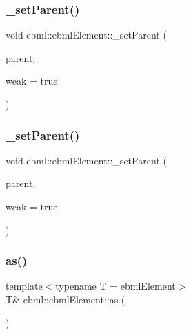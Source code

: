 \subsubsection{\texorpdfstring{\+\_\+set\+Parent()}{\_setParent()}\hspace{0.1cm}{\footnotesize\ttfamily [3/4]}}
{\footnotesize\ttfamily void ebml\+::ebml\+Element\+::\+\_\+set\+Parent (\begin{DoxyParamCaption}\item[{\mbox{\hyperlink{namespaceebml_adad533b7705a16bb360fe56380c5e7be}{ebml\+Element\+\_\+sp}} \&\&}]{parent,  }\item[{bool}]{weak = {\ttfamily true} }\end{DoxyParamCaption})\hspace{0.3cm}{\ttfamily [protected]}}

\mbox{\label{classebml_1_1ebmlElement_a96ce6cd8233aaad83c510aef19b0d345}} 
\subsubsection{\texorpdfstring{\+\_\+set\+Parent()}{\_setParent()}\hspace{0.1cm}{\footnotesize\ttfamily [4/4]}}
{\footnotesize\ttfamily void ebml\+::ebml\+Element\+::\+\_\+set\+Parent (\begin{DoxyParamCaption}\item[{\mbox{\hyperlink{namespaceebml_a2deef4e8071531b32e3533f1bf978917}{c\+\_\+ebml\+Element\+\_\+sp}} \&\&}]{parent,  }\item[{bool}]{weak = {\ttfamily true} }\end{DoxyParamCaption})\hspace{0.3cm}{\ttfamily [protected]}}

\mbox{\label{classebml_1_1ebmlElement_a607040308ec26d2a8cc75ba30306fe1c}} 
\subsubsection{\texorpdfstring{as()}{as()}\hspace{0.1cm}{\footnotesize\ttfamily [1/2]}}
{\footnotesize\ttfamily template$<$typename T  = ebml\+Element$>$ \\
T\& ebml\+::ebml\+Element\+::as (\begin{DoxyParamCaption}{ }\end{DoxyParamCaption})\hspace{0.3cm}{\ttfamily [inline]}}

